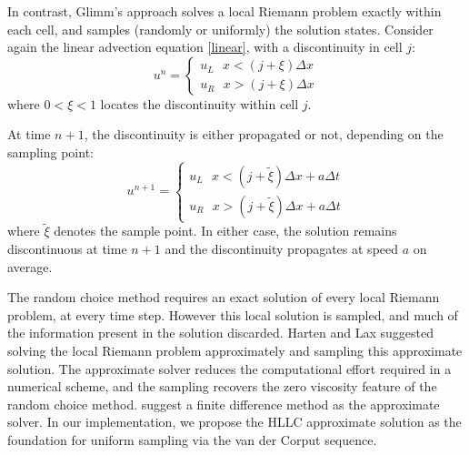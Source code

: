 In contrast, Glimm\rq{}s approach solves a local Riemann problem exactly within each cell,
and samples (randomly or uniformly) the solution states. Consider again the linear advection equation \ref{linear}, with a discontinuity in cell $j$:
\begin{equation}
u^n = \begin{cases}
	u_L ~~~ x< (j+\xi)\Delta x \\
 	u_R ~~~ x> (j+\xi)\Delta x
	\end{cases}			
\end{equation}
where $0<\xi<1$ locates the discontinuity within cell $j$.

At time $n+1$, the discontinuity is either propagated or not, depending on the sampling
point:
\begin{equation}
u^{n+1} = \begin{cases}
		  u_L ~~~ x< (j+\tilde \xi)\Delta x + a \Delta t \\
		  u_R ~~~ x> (j+\tilde \xi)\Delta x + a \Delta t
	        \end{cases}
\end{equation}
where $\tilde \xi$ denotes the sample point.
In either case, the solution remains discontinuous at time $n+1$ and the 
discontinuity propagates at speed $a$ on average.

The random choice method requires an exact solution of every local Riemann problem, at every time step.
However this local solution is sampled, and much of the information present in the solution discarded.
Harten and Lax \citet{harten1981random} suggested solving the local Riemann problem approximately 
and sampling this approximate solution. The approximate solver reduces the computational
effort required in a numerical scheme, and the sampling recovers the zero viscosity
feature of the random choice method. \citet{hartenlax} suggest a finite difference
method as the approximate solver.
In our implementation, we propose the HLLC approximate solution as the foundation for
uniform sampling via the van der Corput sequence.
\citep{glimm1965solutions}
\citep{colella1982glimm}
\citep{chorin1976random}
\citep{concus1979numerical}
\citep{warming1974modified}
\citep{liu1977deterministic}



